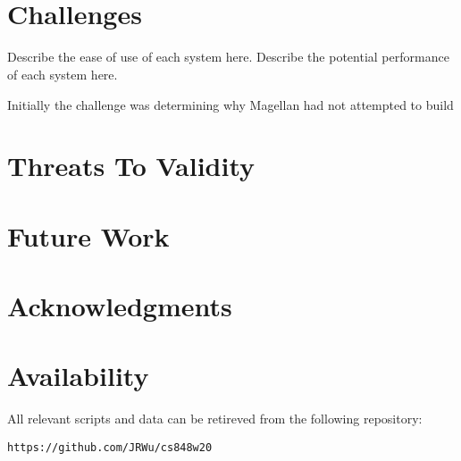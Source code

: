 \documentclass[letterpaper,twocolumn,10pt]{article}
\begin{document}
\noindent{}
\\\\

\section{Challenges}
Describe the ease of use of each system here.
Describe the potential performance of each system here.

Initially the challenge was determining why Magellan had not attempted to build 








\section{Threats To Validity}


\section{Future Work}


\section{Acknowledgments}


\section{Availability}\label{Availability}
All relevant scripts and data can be retireved from the following repository:
\begin{center}
{\tt https://github.com/JRWu/cs848w20}
\end{center}

{\footnotesize 

\theendnotes

\newpage
}
\end{document}
